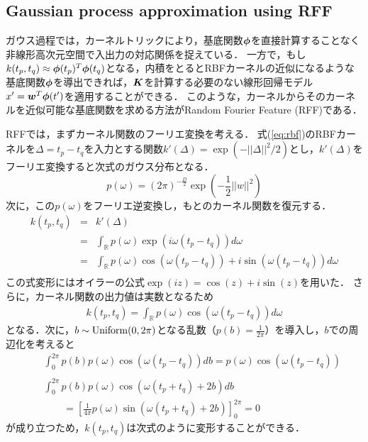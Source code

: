 \documentclass[conference]{IEEEtran}
\begin{document}
\subsection{Gaussian process approximation using RFF}
ガウス過程では，カーネルトリックにより，基底関数${\boldsymbol\phi}$を直接計算することなく非線形高次元空間で入出力の対応関係を捉えている．
一方で，もし$k(t_p,t_q)\approx {\boldsymbol\phi}(t_p)^T {\boldsymbol\phi}(t_q)$となる，内積をとるとRBFカーネルの近似になるような基底関数${\boldsymbol\phi}$を導出できれば，${ \boldsymbol K}$を計算する必要のない線形回帰モデル$x'={ \boldsymbol w}^T {\boldsymbol\phi}(t')$を適用することができる．
このような，カーネルからそのカーネルを近似可能な基底関数を求める方法がRandom Fourier Feature (RFF)\cite{Rahimi2007}である．

RFFでは，まずカーネル関数のフーリエ変換を考える．
式(\ref{eq:rbf})のRBFカーネルを$\Delta = t_p - t_q$を入力とする関数$k'(\Delta)=\exp( -||\Delta||^2/2 )$とし，$k'(\Delta)$をフーリエ変換すると次式のガウス分布となる．
%
\begin{equation}
p(\omega) = (2 \pi)^{-\frac{D}{2}} \exp(-\frac{1}{2}||w||^2)
\end{equation}
%
次に，この$p(\omega)$をフーリエ逆変換し，もとのカーネル関数を復元する．
%
\begin{eqnarray}
k(t_p,t_q) &=& k'(\Delta) \\
&=& \int_\mathbb{R} p(\omega) \exp( i \omega (t_p - t_q) ) d \omega \\
&=& \int_\mathbb{R} p(\omega)\cos(\omega (t_p - t_q)) + i \sin(\omega (t_p - t_q)) d \omega \nonumber \\
\end{eqnarray}
%
この式変形にはオイラーの公式$\exp(iz) = \cos(z) + i \sin(z)$を用いた．
さらに，カーネル関数の出力値は実数となるため
%
\begin{eqnarray}
k(t_p,t_q) = \int_\mathbb{R} p(\omega)\cos(\omega (t_p - t_q)) d \omega 
\end{eqnarray}
%
となる．次に，$b \sim {\rm Uniform}(0, 2 \pi)$となる乱数（$p(b) = \frac{1}{2 \pi}$）を導入し，$b$での周辺化を考えると
%
\begin{eqnarray}
&&\int_0^{2 \pi} p(b) p(\omega)\cos(\omega (t_p - t_q)) d b = p(\omega)\cos(\omega (t_p - t_q)) \nonumber \\ \\
&&\int_0^{2 \pi} p(b) p(\omega)\cos(\omega (t_p + t_q) + 2 b) d b \\
&&~~~~~~~~~= \left[ \frac{1}{4 \pi} p(\omega)\sin(\omega (t_p + t_q) + 2 b)  \right]_0^{2 \pi}=0 
\end{eqnarray}
%
が成り立つため，$k(t_p,t_q)$は次式のように変形することができる．
\end{document}
